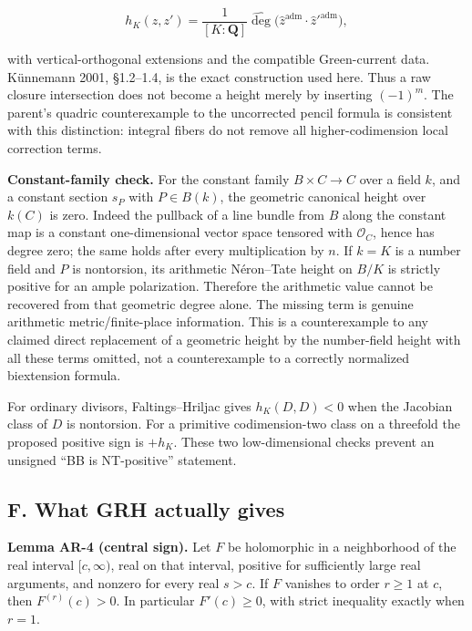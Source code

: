 \documentclass[11pt,a4paper]{article}
\begin{document}
\[
h_K(z,z')=\frac1{[K:\mathbf Q]}\widehat{\deg}
 \bigl(\widehat z^{\mathrm{adm}}\cdot\widehat z'^{\mathrm{adm}}\bigr),
\tag{AR.6}
\]

with vertical-orthogonal extensions and the compatible Green-current
data. Künnemann 2001, §1.2--1.4, is the exact construction used here.
Thus a raw closure intersection does not become a height merely by
inserting \((-1)^m\). The parent's quadric counterexample to the
uncorrected pencil formula is consistent with this distinction: integral
fibers do not remove all higher-codimension local correction terms.

\textbf{Constant-family check.} For the constant family
\(B\times C\to C\) over a field \(k\), and a constant section \(s_P\)
with \(P\in B(k)\), the geometric canonical height over \(k(C)\) is
zero. Indeed the pullback of a line bundle from \(B\) along the constant
map is a constant one-dimensional vector space tensored with
\(\mathcal O_C\), hence has degree zero; the same holds after every
multiplication by \(n\). If \(k=K\) is a number field and \(P\) is
nontorsion, its arithmetic Néron--Tate height on \(B/K\) is strictly
positive for an ample polarization. Therefore the arithmetic value
cannot be recovered from that geometric degree alone. The missing term
is genuine arithmetic metric/finite-place information. This is a
counterexample to any claimed direct replacement of a geometric height
by the number-field height with all these terms omitted, not a
counterexample to a correctly normalized biextension formula.

For ordinary divisors, Faltings--Hriljac gives \(h_K(D,D)<0\) when the
Jacobian class of \(D\) is nontorsion. For a primitive codimension-two
class on a threefold the proposed positive sign is \(+h_K\). These two
low-dimensional checks prevent an unsigned ``BB is NT-positive''
statement.

\subsection{F. What GRH actually
gives}\label{f.-what-grh-actually-gives}

\textbf{Lemma AR-4 (central sign).} Let \(F\) be holomorphic in a
neighborhood of the real interval \([c,\infty)\), real on that interval,
positive for sufficiently large real arguments, and nonzero for every
real \(s>c\). If \(F\) vanishes to order \(r\ge1\) at \(c\), then
\(F^{(r)}(c)>0\). In particular \(F'(c)\ge0\), with strict inequality
exactly when \(r=1\).
\end{document}
